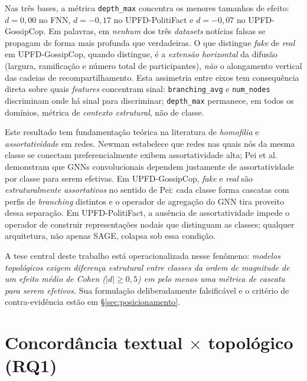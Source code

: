 Nas tr\^es bases, a m\'etrica
\texttt{depth\_max} concentra os menores tamanhos de efeito: $d =
0{,}00$ no FNN, $d = -0{,}17$ no UPFD-PolitiFact e $d = -0{,}07$ no
UPFD-GossipCop. Em palavras, em \emph{nenhum} dos tr\^es \emph{datasets}
not\'icias falsas se propagam de forma mais profunda que verdadeiras.
O que distingue \emph{fake} de \emph{real} em UPFD-GossipCop, quando
distingue, \'e a \emph{extens\~ao horizontal} da difus\~ao (largura,
ramifica\c{c}\~ao e n\'umero total de participantes), \emph{n\~ao} o
alongamento vertical das cadeias de recompartilhamento. Esta
assimetria entre eixos tem consequ\^encia direta sobre quais
\emph{features} concentram sinal: \texttt{branching\_avg} e
\texttt{num\_nodes} discriminam onde h\'a sinal para discriminar;
\texttt{depth\_max} permanece, em todos os dom\'inios, m\'etrica
de \emph{contexto estrutural}, n\~ao de classe.

Este resultado tem fundamenta\c{c}\~ao te\'orica na literatura de
\emph{homofilia} e \emph{assortatividade} em redes. Newman
\cite{newman2003mixing} estabelece que redes nas quais n\'os da mesma
classe se conectam preferencialmente exibem assortatividade alta; Pei et
al.\ \cite{pei2020geomgcn} demonstram que GNNs convolucionais dependem
justamente de assortatividade por classe para serem efetivas. Em
UPFD-GossipCop, \emph{fake} e \emph{real} s\~ao
\emph{estruturalmente assortativos} no sentido de Pei: cada classe forma
cascatas com perfis de \emph{branching} distintos e o operador de
agrega\c{c}\~ao do GNN tira proveito dessa separa\c{c}\~ao. Em
UPFD-PolitiFact, a aus\^encia de assortatividade impede o operador de
construir representa\c{c}\~oes nodais que distinguam as classes;
qualquer arquitetura, n\~ao apenas SAGE, colapsa sob essa condi\c{c}\~ao.

A tese central deste trabalho est\'a operacionalizada nesse fen\^omeno:
\emph{modelos topol\'ogicos exigem diferen\c{c}a estrutural entre classes
da ordem de magnitude de um efeito m\'edio de Cohen ($|d| \geq 0{,}5$) em
pelo menos uma m\'etrica de cascata para serem efetivos.} Sua
formula\c{c}\~ao deliberadamente falsific\'avel e o crit\'erio de
contra-evid\^encia est\~ao em \S\ref{sec:posicionamento}.

\section{Concord\^ancia textual \texorpdfstring{$\times$}{x} topol\'ogico (RQ1)}
\label{sec:concordancia}

